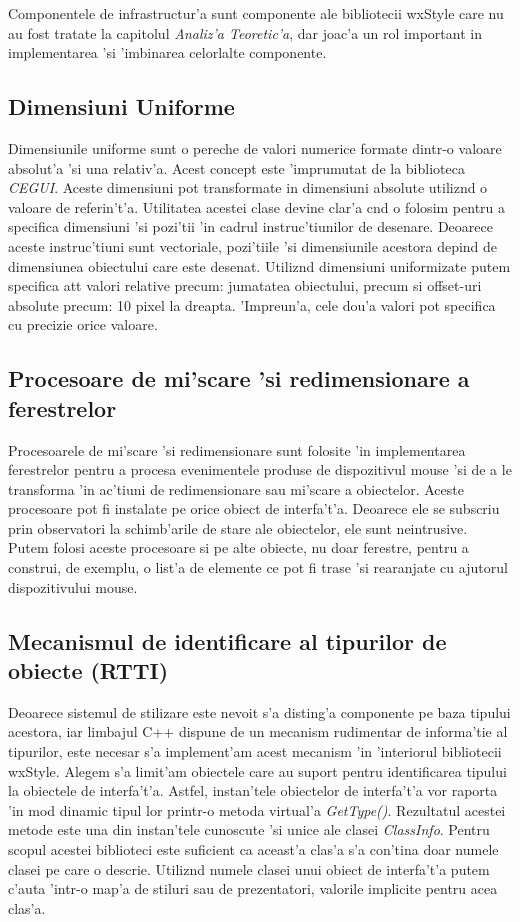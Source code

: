Componentele de infrastructur'a sunt componente ale bibliotecii wxStyle care nu au fost tratate la capitolul \emph{Analiz'a Teoretic'a}, dar joac'a un rol important in implementarea 'si 'imbinarea celorlalte componente.

\subsection{Dimensiuni Uniforme}

Dimensiunile uniforme sunt o pereche de valori numerice formate dintr-o valoare absolut'a 'si una relativ'a. Acest concept este 'imprumutat de la biblioteca \emph{CEGUI}. Aceste dimensiuni pot transformate in dimensiuni absolute utiliz{\ia}nd o valoare de referin't'a. Utilitatea acestei clase devine clar'a c{\ia}nd o folosim pentru a specifica dimensiuni 'si pozi'tii 'in cadrul instruc'tiunilor de desenare. Deoarece aceste instruc'tiuni sunt vectoriale, pozi'tiile 'si dimensiunile acestora depind de dimensiunea obiectului care este desenat. Utiliz{\ia}nd dimensiuni uniformizate putem specifica at{\ia}t valori relative precum: jumatatea obiectului, precum si offset-uri absolute precum: 10 pixel la dreapta. 'Impreun'a, cele dou'a valori pot specifica cu precizie orice valoare.

\subsection{Procesoare de mi'scare 'si redimensionare a ferestrelor}

Procesoarele de mi'scare 'si redimensionare sunt folosite 'in implementarea ferestrelor pentru a procesa evenimentele produse de dispozitivul mouse 'si de a le transforma 'in ac'tiuni de redimensionare sau mi'scare a obiectelor. Aceste procesoare pot fi instalate pe orice obiect de interfa't'a. Deoarece ele se subscriu prin observatori la schimb'arile de stare ale obiectelor, ele sunt neintrusive. Putem folosi aceste procesoare si pe alte obiecte, nu doar ferestre, pentru a construi, de exemplu, o list'a de elemente ce pot fi trase 'si rearanjate cu ajutorul dispozitivului mouse.

\subsection{Mecanismul de identificare al tipurilor de obiecte (RTTI)}

Deoarece sistemul de stilizare este nevoit s'a disting'a componente pe baza tipului acestora, iar limbajul C++ dispune de un mecanism rudimentar de informa'tie al tipurilor, este necesar s'a implement'am acest mecanism 'in 'interiorul bibliotecii wxStyle. Alegem s'a limit'am obiectele care au suport pentru identificarea tipului la obiectele de interfa't'a. Astfel, instan'tele obiectelor de interfa't'a vor raporta 'in mod dinamic tipul lor printr-o metoda virtual'a \emph{GetType()}. Rezultatul acestei metode este una din instan'tele cunoscute 'si unice ale clasei \emph{ClassInfo}. Pentru scopul acestei biblioteci este suficient ca aceast'a clas'a s'a con'tina doar numele clasei pe care o descrie. Utiliz{\ia}nd numele clasei unui obiect de interfa't'a putem c'auta 'intr-o map'a de stiluri sau de prezentatori, valorile implicite pentru acea clas'a.

